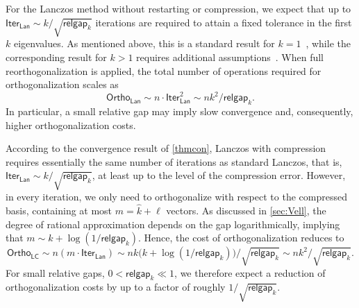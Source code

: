 \documentclass{siamart190516}
\newcommand{\lan}{\mathsf{Lan}}
\newcommand{\iter}{\mathsf{Iter}}
\newcommand{\lc}{\mathsf{LC}}
\newcommand{\comp}{\mathsf{Ortho}}
\newcommand{\gap}{\mathsf{relgap}}
\begin{document}
For the Lanczos method without restarting or compression, we expect that up to $\iter_{\lan} \sim k / \sqrt{\gap_{k}}$ iterations are required to attain a fixed tolerance in the first $k$ eigenvalues. As mentioned above, this is a standard result for $k = 1$~\cite{Saad1980, Parlett1998}, while the corresponding result for $k > 1$ requires additional assumptions~\cite{kressner2024randomized}.
When full reorthogonalization is applied, the total number of operations required for orthogonalization scales as
\begin{equation*}
    \comp_{\lan} \sim n\cdot \iter^2_{\lan} \sim n k^2 / \gap_{k}.
\end{equation*}
In particular, a small relative gap may imply slow convergence and, consequently, higher orthogonalization costs.

According to the convergence result of \cref{thmcon}, Lanczos with compression requires essentially the same number of iterations as standard Lanczos, that is, $\iter_{\lan}\sim k / \sqrt{\gap_{k}}$, at least up to the level of the compression error.
However, in every iteration, we only need to orthogonalize with respect to the compressed basis, containing at most $m = \widehat{k} + \ell$ vectors. As discussed in \cref{sec:Vell}, the degree of rational approximation depends on the gap logarithmically, implying that $m\sim k+\log(1/\gap_{k})$.
Hence, the cost of orthogonalization reduces to 
\begin{equation*}
    \comp_{\lc} \sim n (m\cdot \iter_{\lan})  \sim n k\bigl(k + \log(1/\gap_{k})\bigr) / \sqrt{\gap_{k}}\sim nk^{2} / \sqrt{\gap_{k}}.
\end{equation*}
For small relative gaps, $0<\gap_{k}\ll 1$, we therefore expect a reduction of orthogonalization costs by up to a factor of roughly $1/\sqrt{\gap_{k}}$.
\end{document}
